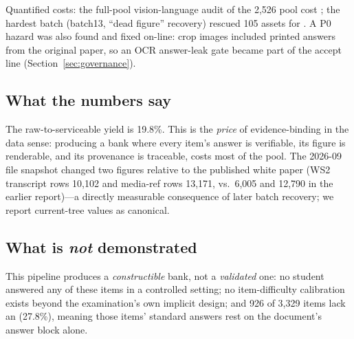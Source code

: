 Quantified costs: the full-pool vision-language audit of the 2,526 pool cost ; the hardest batch (batch13, ``dead figure'' recovery) rescued 105 assets for . A P0 hazard was also found and fixed on-line: crop images included printed answers from the original paper, so an OCR answer-leak gate became part of the accept line (Section~\ref{sec:governance}).

\subsection{What the numbers say}
The raw-to-serviceable yield is 19.8\%. This is the \emph{price} of evidence-binding in the data sense: producing a bank where every item's answer is verifiable, its figure is renderable, and its provenance is traceable, costs most of the pool. The 2026-09 file snapshot changed two figures relative to the published white paper (WS2 transcript rows 10,102 and media-ref rows 13,171, vs.\ 6,005 and 12,790 in the earlier report)---a directly measurable consequence of later batch recovery; we report current-tree values as canonical.

\subsection{What is \emph{not} demonstrated}
This pipeline produces a \emph{constructible} bank, not a \emph{validated} one: no student answered any of these items in a controlled setting; no item-difficulty calibration exists beyond the examination's own implicit design; and 926 of 3,329 items lack an  (27.8\%), meaning those items' standard answers rest on the document's answer block alone.
